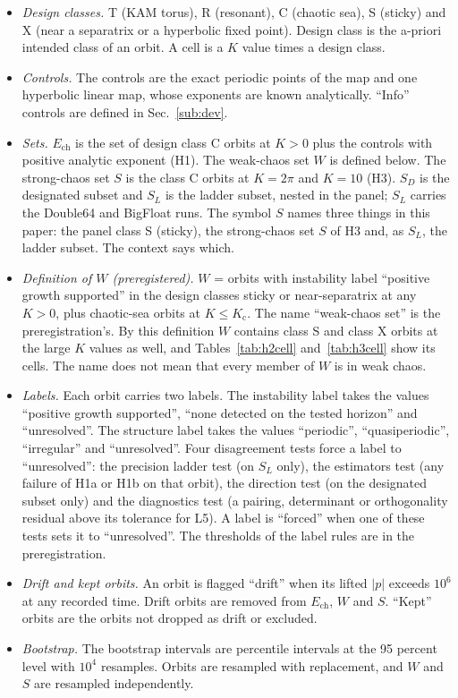 \documentclass[aip,cha,reprint,amsmath,amssymb,longbibliography]{revtex4-2}
\newcommand{\tenp}[1]{\ensuremath{10^{#1}}}
\newcommand{\Ech}{\ensuremath{E_{\mathrm{ch}}}}
\newcommand{\Kc}{\ensuremath{K_{\mathrm{c}}}}
\newcommand{\Sec}[1]{Sec.~\ref{#1}}
\begin{document}
\begin{itemize}
\item \emph{Design classes.}
T (KAM torus), R (resonant), C (chaotic sea), S (sticky) and X (near a separatrix or a hyperbolic fixed point).
Design class is the a-priori intended class of an orbit.
A cell is a $K$ value times a design class.

\item \emph{Controls.}
The controls are the exact periodic points of the map and one hyperbolic linear map, whose exponents are known analytically.
``Info'' controls are defined in \Sec{sub:dev}.

\item \emph{Sets.}
$\Ech$ is the set of design class C orbits at $K>0$ plus the controls with positive analytic exponent (H1).
The weak-chaos set $W$ is defined below.
The strong-chaos set $S$ is the class C orbits at $K=2\pi$ and $K=10$ (H3).
$S_D$ is the designated subset and $S_L$ is the ladder subset, nested in the panel; $S_L$ carries the Double64 and BigFloat runs.
The symbol $S$ names three things in this paper: the panel class S (sticky), the strong-chaos set $S$ of H3 and, as $S_L$, the ladder subset.
The context says which.

\item \emph{Definition of $W$ (preregistered).}
$W$ = orbits with instability label ``positive growth supported'' in the design classes sticky or near-separatrix at any $K>0$, plus chaotic-sea orbits at $K\le\Kc$.
The name ``weak-chaos set'' is the preregistration's.
By this definition $W$ contains class S and class X orbits at the large $K$ values as well, and Tables~\ref{tab:h2cell} and~\ref{tab:h3cell} show its cells.
The name does not mean that every member of $W$ is in weak chaos.

\item \emph{Labels.}
Each orbit carries two labels.
The instability label takes the values ``positive growth supported'', ``none detected on the tested horizon'' and ``unresolved''.
The structure label takes the values ``periodic'', ``quasiperiodic'', ``irregular'' and ``unresolved''.
Four disagreement tests force a label to ``unresolved'': the precision ladder test (on $S_L$ only), the estimators test (any failure of H1a or H1b on that orbit), the direction test (on the designated subset only) and the diagnostics test (a pairing, determinant or orthogonality residual above its tolerance for L5).
A label is ``forced'' when one of these tests sets it to ``unresolved''.
The thresholds of the label rules are in the preregistration.

\item \emph{Drift and kept orbits.}
An orbit is flagged ``drift'' when its lifted $|p|$ exceeds \tenp{6} at any recorded time.
Drift orbits are removed from $\Ech$, $W$ and $S$.
``Kept'' orbits are the orbits not dropped as drift or excluded.

\item \emph{Bootstrap.}
The bootstrap intervals are percentile intervals at the 95 percent level with $10^{4}$ resamples.
Orbits are resampled with replacement, and $W$ and $S$ are resampled independently.
\end{itemize}
\end{document}
